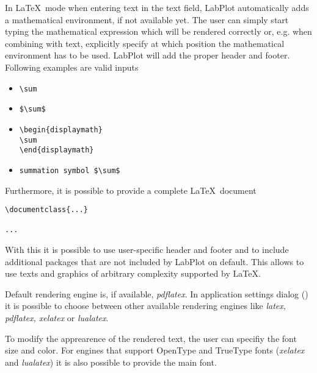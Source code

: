 In \LaTeX\, mode when entering text in the text field, LabPlot automatically adds a mathematical environment, if not available yet. The user can simply start typing the mathematical expression which will be rendered correctly or, e.g. when combining with text, explicitly specify at which position the mathematical environment has to be used. LabPlot will add the proper header and footer. Following examples are valid inputs
\begin{itemize}
\item {
\begin{lstlisting}
\sum
\end{lstlisting}
}
%
\item {
\begin{lstlisting}
$\sum$
\end{lstlisting}
}
%
\item {
\begin{lstlisting}
\begin{displaymath}
\sum
\end{displaymath}
\end{lstlisting}
}
%
\item {
\begin{lstlisting}
summation symbol $\sum$
\end{lstlisting}
}
\end{itemize}
Furthermore, it is possible to provide a complete \LaTeX\, document
\begin{lstlisting}[language={[Latex]TeX}, backgroundcolor=\color{lightgray}, frame=single]
\documentclass{...}

...

\end{lstlisting}

With this it is possible to use user-specific header and footer and to include additional packages that are not included by LabPlot on default. This allows to use texts and graphics of arbitrary complexity supported by \LaTeX.

Default rendering engine is, if available, \textit{pdflatex}. In application settings dialog () it is possible to choose between other available rendering engines like \textit{latex, pdflatex, xelatex} or \textit{lualatex}.

To modify the apprearence of the rendered text, the user can specifiy the font size and color. For engines that support OpenType and TrueType fonts (\textit{xelatex} and \textit{lualatex}) it is also possible to provide the main font.


